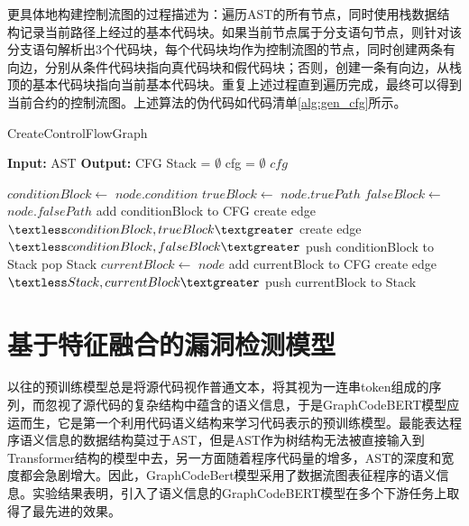 更具体地构建控制流图的过程描述为：遍历AST的所有节点，同时使用栈数据结构记录当前路径上经过的基本代码块。如果当前节点属于分支语句节点，则针对该分支语句解析出3个代码块，每个代码块均作为控制流图的节点，同时创建两条有向边，分别从条件代码块指向真代码块和假代码块；否则，创建一条有向边，从栈顶的基本代码块指向当前基本代码块。重复上述过程直到遍历完成，最终可以得到当前合约的控制流图。上述算法的伪代码如代码清单\autoref{alg:gen_cfg}所示。
\begin{algorithm}
    \caption{CreateControlFlowGraph}
    \label{alg:gen_cfg}
    \begin{algorithmic}[1]
    
    
        \State \textbf{Input:} AST
        \State \textbf{Output:} CFG
        \State Stack = $\emptyset$
        \State cfg = $\emptyset$
        \State {}
        \State \Return $cfg$
    
    
            \State \Return
        \EndIf
            \State $conditionBlock \gets$ $node.condition$
            \State $trueBlock \gets$ $node.truePath$
            \State $falseBlock \gets$ $node.falsePath$
            \State add conditionBlock to CFG
            \State create edge $\textless conditionBlock, trueBlock \textgreater$
            \State create edge $\textless conditionBlock, falseBlock \textgreater$
            \State push conditionBlock to Stack
            \State {}
            \State {}
            \State pop Stack
        \Else
            \State $currentBlock \gets$ $node$
            \State add currentBlock to CFG
                \State create edge $\textless Stack, currentBlock \textgreater$
            \EndIf
            \State push currentBlock to Stack
        \EndIf
            \State {}
        \EndFor
    \EndFunction
    
    \end{algorithmic}
    \end{algorithm}
\section{基于特征融合的漏洞检测模型}
\label{sec:基于特征融合的漏洞检测模型}
以往的预训练模型总是将源代码视作普通文本，将其视为一连串token组成的序列，而忽视了源代码的复杂结构中蕴含的语义信息，于是GraphCodeBERT模型应运而生，它是第一个利用代码语义结构来学习代码表示的预训练模型\cite{guo2020graphcodebert}。最能表达程序语义信息的数据结构莫过于AST，但是AST作为树结构无法被直接输入到Transformer结构的模型中去，另一方面随着程序代码量的增多，AST的深度和宽度都会急剧增大。因此，GraphCodeBert模型采用了数据流图表征程序的语义信息。实验结果表明，引入了语义信息的GraphCodeBERT模型在多个下游任务上取得了最先进的效果。

